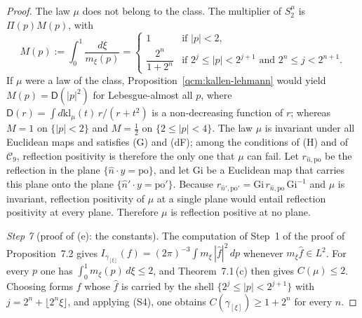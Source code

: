 \documentclass[11pt,letterpaper,reqno]{amsart}
\theoremstyle{definition}
\begin{document}
\begin{proof}
The law $\mu$ does not belong to the class.
The multiplier of $S_2^\mu$ is $\Pi(p)M(p)$, with
\begin{equation*}
M(p):=\int_0^1\frac{d\xi}{m_\xi(p)}=
\begin{cases}
1&\text{if }|p|<2,\\
\dfrac{2^n}{1+2^n}&\text{if }2^j\le|p|<2^{j+1}\text{ and }2^n\le j<2^{n+1}.
\end{cases}
\end{equation*}
If $\mu$ were a law of the class, Proposition~\ref{qcm:kallen-lehmann} would yield $M(p)=\mathsf D(|p|^2)$ for Lebesgue-almost all $p$, where $\mathsf D(r)=\int d\mathrm{kl}_\mu(t)\,r/(r+t^2)$ is a non-decreasing function of $r$;
whereas $M=1$ on $\{|p|<2\}$ and $M=\frac12$ on $\{2\le|p|<4\}$.
The law $\mu$ is invariant under all Euclidean maps and satisfies (G) and (dF);
among the conditions of (H) and of $\mathcal C_9$, reflection positivity is therefore the only one that $\mu$ can fail.
Let $r_{\hat n,\mathrm{po}}$ be the reflection in the plane $\{\hat n\cdot y=\mathrm{po}\}$,
and let $\mathrm{Gi}$ be a Euclidean map that carries this plane onto the plane $\{\hat n'\cdot y=\mathrm{po}'\}$.
Because $r_{\hat n',\mathrm{po}'}=\allowbreak \mathrm{Gi}\,\allowbreak r_{\hat n,\mathrm{po}}\,\allowbreak \mathrm{Gi}^{-1}$ and $\mu$ is invariant, reflection positivity of $\mu$ at a single plane would entail reflection positivity at every plane.
Therefore $\mu$ is reflection positive at no plane.

\emph{Step 7} (proof of (e): the constants).
The computation of Step~1 of the proof of Proposition~7.2 gives $I_{\gamma_{[\xi]}}(f)=(2\pi)^{-3}\int m_\xi\,|\hat f|^2\,dp$ whenever $m_\xi\hat f\in L^2$.
For every $p$ one has $\int_0^1m_\xi(p)\,d\xi\le2$,
and Theorem~7.1\,(c) then gives $C(\mu)\le2$.
Choosing forms $f$ whose $\hat f$ is carried by the shell $\{2^j\le|p|<2^{j+1}\}$ with $j=2^n+\lfloor2^n\xi\rfloor$, and applying (S4), one obtains $C(\gamma_{[\xi]})\ge1+2^n$ for every $n$.
\end{proof}
\end{document}
